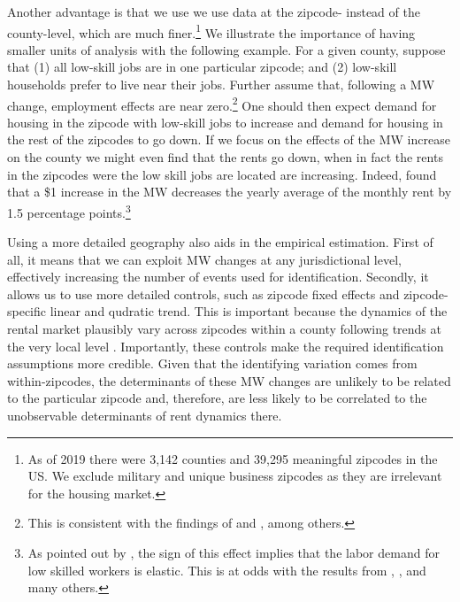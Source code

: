 Another advantage is that we use we use data at the zipcode- instead of the county-level, 
which are much finer.\footnote{As of 2019 there were 3,142 counties and 39,295 meaningful 
	zipcodes in the US. We exclude military and unique business zipcodes as they are 
	irrelevant for the housing market.} 
We illustrate the importance of having smaller units of analysis with the following example. 
For a given county, suppose that (1) all low-skill jobs are in one particular zipcode; and 
(2) low-skill households prefer to live near their jobs. Further assume that, following a MW 
change, employment effects are near zero.\footnote{This is consistent with the findings of 
	\textcite{CardKrueger2000} and \textcite{CegnizEtAl2019}, among others.} 
One should then expect demand for housing in the zipcode with low-skill jobs to increase and 
demand for housing in the rest of the zipcodes to go down. If we focus on the effects of the 
MW increase on the county we might even find that the rents go down, when in fact the rents in 
the zipcodes were the low skill jobs are located are increasing. Indeed, \textcite{Tidemann2018} 
found that a \$1 increase in the MW decreases the yearly average of the monthly rent by 1.5 
percentage points.\footnote{As pointed out by \textcite{Tidemann2018}, the sign of this 
	effect 	implies that the labor demand for low skilled workers is elastic. This is at 
	odds with the results from	\textcite{CardKrueger2000}, \textcite{CegnizEtAl2019}, and many others.} 

Using a more detailed geography also aids in the empirical estimation. First of all, it means 
that we can exploit MW changes at any jurisdictional level, effectively increasing the number 
of events used for identification. Secondly, it allows us to use more detailed controls, such 
as zipcode fixed effects and zipcode-specific linear and qudratic trend. This is important 
because the dynamics of the rental market plausibly vary across zipcodes within a county 
following trends at the very local level \parencite{AlmagroDominguez2019}. Importantly, these 
controls make the required identification assumptions more credible. Given that the identifying 
variation comes from within-zipcodes, the determinants of these MW changes are unlikely to be 
related to the particular zipcode and, therefore, are less likely to be correlated to the 
unobservable determinants of rent dynamics there.


